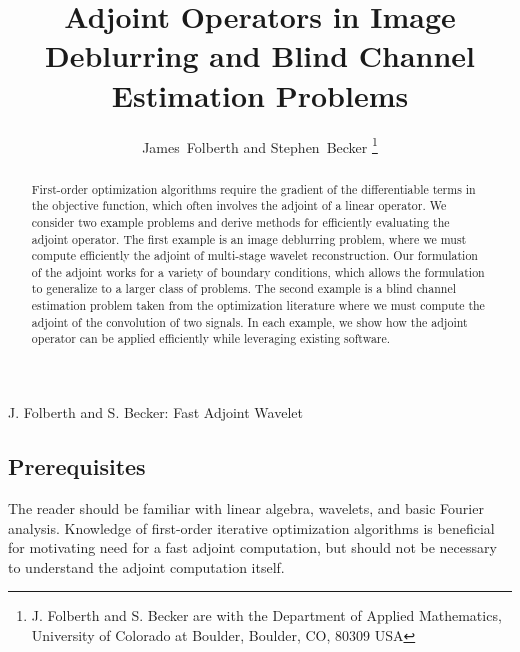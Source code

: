 \documentclass[journal]{IEEEtran}
\begin{document}
\title{Adjoint Operators in Image Deblurring and Blind Channel Estimation Problems}
\author{James~Folberth and 
        Stephen~Becker%
\thanks{J. Folberth and S. Becker are with the Department
of Applied Mathematics, University of Colorado at Boulder,
Boulder, CO, 80309 USA}}

%
{J. Folberth and S. Becker: Fast Adjoint Wavelet}

\maketitle

\begin{abstract}
   First-order optimization algorithms require the gradient of the differentiable terms in the objective function, which often involves the adjoint of a linear operator.  We consider two example problems and derive methods for efficiently evaluating the adjoint operator.  The first example is an image deblurring problem, where we must compute efficiently the adjoint of multi-stage wavelet reconstruction.  Our formulation of the adjoint works for a variety of boundary conditions, which allows the formulation to generalize to a larger class of problems.  The second example is a blind channel estimation problem taken from the optimization literature where we must compute the adjoint of the convolution of two signals.  In each example, we show how the adjoint operator can be applied efficiently while leveraging existing software.
\end{abstract}

\subsection*{Prerequisites}
The reader should be familiar with linear algebra, wavelets, and basic Fourier analysis.  Knowledge of first-order iterative optimization algorithms is beneficial for motivating need for a fast adjoint computation, but should not be necessary to understand the adjoint computation itself.\\
\end{document}
